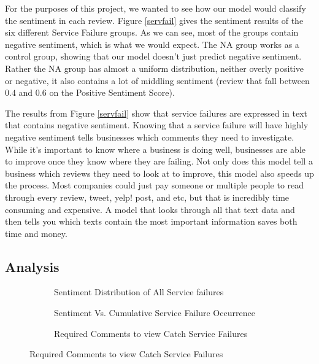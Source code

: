\documentclass[titlepage,letterpaper]{article}
\begin{document}
For the purposes of this project, we wanted to see how our model would classify the sentiment in each review. Figure \ref{servfail} gives the sentiment results of the six different Service Failure groups. As we can see, most of the groups contain negative sentiment, which is what we would expect. The NA group works as a control group, showing that our model doesn't just predict negative sentiment. Rather the NA group has almost a uniform distribution, neither overly positive or negative, it also contains a lot of middling sentiment (review that fall between $0.4$ and $0.6$ on the Positive Sentiment Score).

The results from Figure \ref{servfail} show that service failures are expressed in text that contains negative sentiment. Knowing that a service failure will have highly negative sentiment tells businesses which comments they need to investigate. While it's important to know where a business is doing well, businesses are able to improve once they know where they are failing. Not only does this model tell a business which reviews they need to look at to improve, this model also speeds up the process. Most companies could just pay someone or multiple people to read through every review, tweet, yelp! post, and etc, but that is incredibly time consuming and expensive. A model that looks through all that text data and then tells you which texts contain the most important information saves both time and money.  






\subsection{Analysis}


\begin{figure}[]
		\vspace*{-1.25in}
		\begin{adjustwidth*}{-1in}{-1in}
\begin{subfigure}{16cm}
\caption{Sentiment Distribution of All Service failures}
\label{all}

\end{subfigure}

\begin{subfigure}{16cm}
		\centering
		\caption{Sentiment Vs. Cumulative Service Failure Occurrence}
		\label{sentivfail}
		
\end{subfigure}

\begin{subfigure}{16cm}
		\centering
		\caption{Required Comments to view Catch  Service Failures}
		\label{sentichick}
		
\end{subfigure}
	\end{adjustwidth*}
\end{figure}
\end{document}
